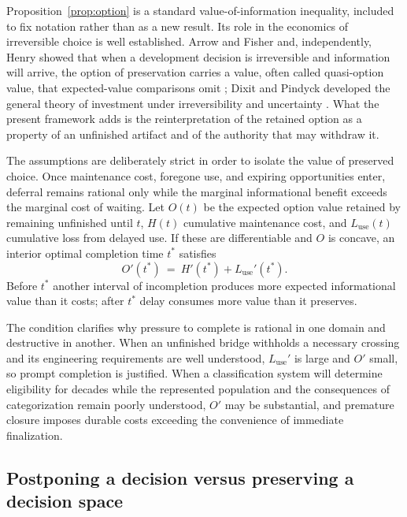 Proposition~\ref{prop:option} is a standard value-of-information inequality, included to fix notation rather than as a new result. Its role in the economics of irreversible choice is well established. Arrow and Fisher and, independently, Henry showed that when a development decision is irreversible and information will arrive, the option of preservation carries a value, often called quasi-option value, that expected-value comparisons omit \cite{arrowfisher1974,henry1974}; Dixit and Pindyck developed the general theory of investment under irreversibility and uncertainty \cite{dixitpindyck1994}. What the present framework adds is the reinterpretation of the retained option as a property of an unfinished artifact and of the authority that may withdraw it.

The assumptions are deliberately strict in order to isolate the value of preserved choice. Once maintenance cost, foregone use, and expiring opportunities enter, deferral remains rational only while the marginal informational benefit exceeds the marginal cost of waiting. Let $O(t)$ be the expected option value retained by remaining unfinished until $t$, $H(t)$ cumulative maintenance cost, and $L_{\mathrm{use}}(t)$ cumulative loss from delayed use. If these are differentiable and $O$ is concave, an interior optimal completion time $t^\ast$ satisfies
\begin{equation}\label{eq:stopping}
O'(t^\ast)\ =\ H'(t^\ast)+L_{\mathrm{use}}'(t^\ast).
\end{equation}
Before $t^\ast$ another interval of incompletion produces more expected informational value than it costs; after $t^\ast$ delay consumes more value than it preserves.

The condition clarifies why pressure to complete is rational in one domain and destructive in another. When an unfinished bridge withholds a necessary crossing and its engineering requirements are well understood, $L_{\mathrm{use}}'$ is large and $O'$ small, so prompt completion is justified. When a classification system will determine eligibility for decades while the represented population and the consequences of categorization remain poorly understood, $O'$ may be substantial, and premature closure imposes durable costs exceeding the convenience of immediate finalization.

\subsection{Postponing a decision versus preserving a decision space}

